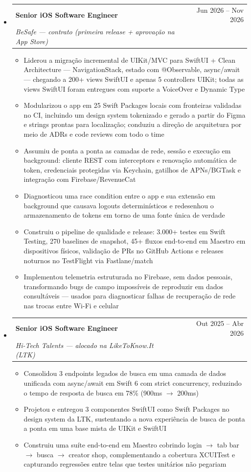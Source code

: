 \documentclass[11pt,letterpaper]{article}
\makeatletter
\newcommand{\resumeSubheading}[4]{
  \item
    \begin{tabular*}{\linewidth}{l@{\extracolsep{\fill}}r}
      \textbf{#1} & #2 \\
      \textit{#3} & \textit{#4} \\
    \end{tabular*}
}
\newcommand{\resumeItem}[1]{
  \item{#1}
}
\makeatother
\begin{document}
\begin{itemize}[leftmargin=0.15in, label={}]
    \resumeSubheading
        {Senior iOS Software Engineer}{Jun 2026 -- Nov 2026}
        {BeSafe --- contrato (primeira release + aprovação na App Store)}{}
        \begin{itemize}
            \resumeItem{Liderou a migração incremental de UIKit/MVC para SwiftUI + Clean Architecture --- NavigationStack, estado com \mbox{@Observable}, async/await --- chegando a 200+ views SwiftUI e apenas 5 controllers UIKit; todas as views SwiftUI foram entregues com suporte a VoiceOver e Dynamic Type}
            \resumeItem{Modularizou o app em 25 Swift Packages locais com fronteiras validadas no CI, incluindo um design system tokenizado e gerado a partir do Figma e strings prontas para localização; conduziu a direção de arquitetura por meio de ADRs e code reviews com todo o time}
            \resumeItem{Assumiu de ponta a ponta as camadas de rede, sessão e execução em background: cliente REST com interceptors e renovação automática de token, credenciais protegidas via Keychain, gatilhos de APNs/BGTask e integração com Firebase/RevenueCat}
            \resumeItem{Diagnosticou uma race condition entre o app e sua extensão em background que causava logouts determinísticos e redesenhou o armazenamento de tokens em torno de uma fonte única de verdade}
            \resumeItem{Construiu o pipeline de qualidade e release: 3.000+ testes em Swift Testing, 270 baselines de snapshot, 45+ fluxos end-to-end em Maestro em dispositivos físicos, validação de PRs no GitHub Actions e releases noturnos no TestFlight via Fastlane/match}
            \resumeItem{Implementou telemetria estruturada no Firebase, sem dados pessoais, transformando bugs de campo impossíveis de reproduzir em dados consultáveis --- usados para diagnosticar falhas de recuperação de rede nas trocas entre Wi-Fi e celular}
        \end{itemize}

    \resumeSubheading
        {Senior iOS Software Engineer}{Out 2025 -- Abr 2026}
        {Hi-Tech Talents --- alocado na LikeToKnow.It (LTK)}{}
        \begin{itemize}
            \resumeItem{Consolidou 3 endpoints legados de busca em uma camada de dados unificada com async/await em Swift 6 com strict concurrency, reduzindo o tempo de resposta de busca em 78\% (900ms $\rightarrow$ 200ms)}
            \resumeItem{Projetou e entregou 3 componentes SwiftUI como Swift Packages no design system da LTK, sustentando a nova experiência de busca de ponta a ponta em uma base mista de UIKit e SwiftUI}
            \resumeItem{Construiu uma suíte end-to-end em Maestro cobrindo login $\rightarrow$ tab bar $\rightarrow$ busca $\rightarrow$ creator shop, complementando a cobertura XCUITest e capturando regressões entre telas que testes unitários não pegariam}
        \end{itemize}


\end{itemize}
\end{document}
